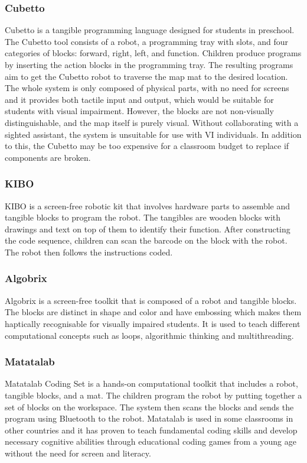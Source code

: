 \documentclass[oneside,%
                    author={Malak Hajji},
                    degree={BSc},
                    title={Designing An Accessible Ozobot Programming Platform for Students},
                  subtitle={With Mixed Visual Abilities}]{dissertation}
\begin{document}
\subsubsection{Cubetto}
Cubetto\cite{cubetto} is a tangible programming language designed for students in preschool. The Cubetto tool consists of a robot, a programming tray with slots, and four categories of blocks: forward, right, left, and function. Children produce programs by inserting the action blocks in the programming tray. The resulting programs aim to get the Cubetto robot to traverse the map mat to the desired location. The whole system is only composed of physical parts, with no need for screens and it provides both tactile input and output, which would be suitable for students with visual impairment. However, the blocks are not non-visually distinguishable, and the map itself is purely visual. Without collaborating with a sighted assistant, the system is unsuitable for use with VI individuals. In addition to this, the Cubetto may be too expensive for a classroom budget to replace if components are broken.  

\subsubsection{KIBO}
KIBO\cite{kibo} is a screen-free robotic kit that involves hardware parts to assemble and tangible blocks to program the robot. The tangibles are wooden blocks with drawings and text on top of them to identify their function. After constructing the code sequence, children can scan the barcode on the block with the robot. The robot then follows the instructions coded.  

\subsubsection{Algobrix}
Algobrix is a screen-free toolkit that is composed of a robot and tangible blocks. The blocks are distinct in shape and color and have embossing which makes them haptically recognisable for visually impaired students. It is used to teach different computational concepts such as loops, algorithmic thinking and multithreading. 

\subsubsection{Matatalab}
Matatalab Coding Set is a hands-on computational toolkit that includes a robot, tangible blocks, and a mat. The children program the robot by putting together a set of blocks on the workspace. The system then scans the blocks and sends the program using Bluetooth to the robot. Matatalab is used in some classrooms in other countries and it has proven to teach fundamental coding skills and develop necessary cognitive abilities through educational coding games from a young age without the need for screen and literacy. 
\end{document}
